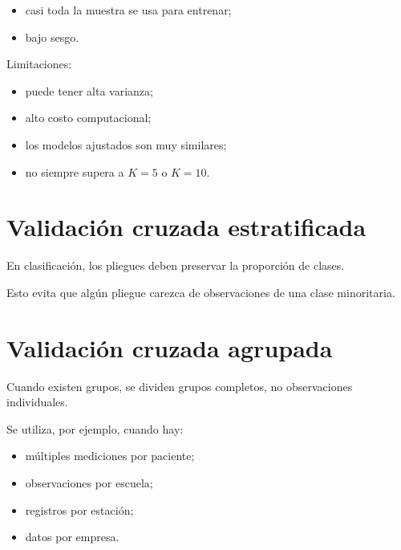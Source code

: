 \documentclass[
  spanish,
  10.5pt,
  letterpaper,
  DIV=11,
  numbers=noendperiod,
  oneside,
  open=any]{scrreprt}
\providecommand{\tightlist}{%
  \setlength{\itemsep}{0pt}\setlength{\parskip}{0pt}}
\theoremstyle{definition}
\theoremstyle{definition}
\theoremstyle{plain}
\theoremstyle{remark}
\begin{document}
\begin{itemize}
\tightlist
\item
  casi toda la muestra se usa para entrenar;
\item
  bajo sesgo.
\end{itemize}

Limitaciones:

\begin{itemize}
\tightlist
\item
  puede tener alta varianza;
\item
  alto costo computacional;
\item
  los modelos ajustados son muy similares;
\item
  no siempre supera a \(K=5\) o \(K=10\).
\end{itemize}

\section*{Validación cruzada
estratificada}\label{validaciuxf3n-cruzada-estratificada}


En clasificación, los pliegues deben preservar la proporción de clases.

Esto evita que algún pliegue carezca de observaciones de una clase
minoritaria.

\section*{Validación cruzada
agrupada}\label{validaciuxf3n-cruzada-agrupada}


Cuando existen grupos, se dividen grupos completos, no observaciones
individuales.

Se utiliza, por ejemplo, cuando hay:

\begin{itemize}
\tightlist
\item
  múltiples mediciones por paciente;
\item
  observaciones por escuela;
\item
  registros por estación;
\item
  datos por empresa.
\end{itemize}
\end{document}
